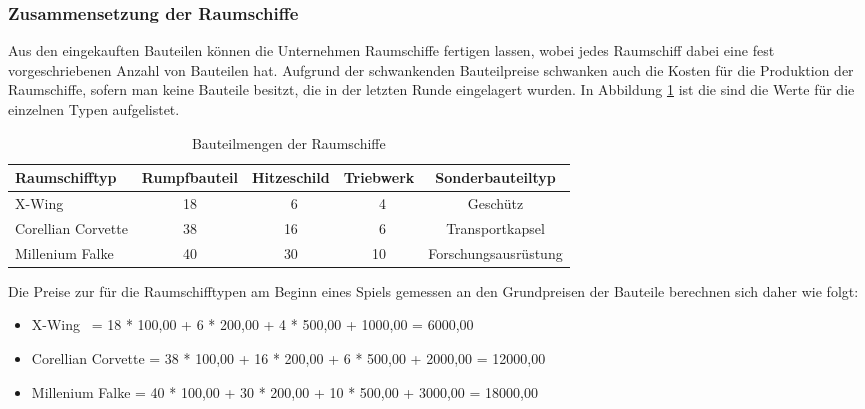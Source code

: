 \subsubsection{Zusammensetzung der Raumschiffe}
\label{subsub:spielwelt-datenbasis-raumschiffe-zusammensetzung}

Aus den eingekauften Bauteilen können die Unternehmen Raumschiffe fertigen lassen, wobei jedes Raumschiff dabei eine fest vorgeschriebenen Anzahl von Bauteilen hat. Aufgrund der schwankenden Bauteilpreise schwanken auch die Kosten für die Produktion der Raumschiffe, sofern man keine Bauteile besitzt, die in der letzten Runde eingelagert wurden. In Abbildung \ref{tab:spielwelt-datenbasis-raumschiffe-zusammensetzung} ist die sind die Werte für die einzelnen Typen aufgelistet.

\begin{table}[ht]\small
     \centering
     \begin{tabular}{ | l | c | c | c | c |  }
          \hline
          Raumschifftyp & Rumpfbauteil & Hitzeschild & Triebwerk & Sonderbauteiltyp \\
          \hline \hline
          X-Wing & 18 & \ 6 & \ 4 & Geschütz\\ \hline
          Corellian Corvette & 38 & 16 & \ 6 & Transportkapsel \\ \hline
          Millenium Falke & 40 & 30 & 10 & Forschungsausrüstung \\
          \hline
     \end{tabular}
     \caption{Bauteilmengen der Raumschiffe}
     \label{tab:spielwelt-datenbasis-raumschiffe-zusammensetzung}
\end{table}

Die Preise zur für die Raumschifftypen am Beginn eines Spiels gemessen an den Grundpreisen der Bauteile berechnen sich daher wie folgt:

\begin{itemize}
\item[] X-Wing \qquad\             = 18 * 100,00\curr{} +  6 * 200,00\curr{} +  4 * 500,00\curr{} + 1000,00\curr{} =  6000,00\curr{}
\item[] Corellian Corvette = 38 * 100,00\curr{} + 16 * 200,00\curr{} +  6 * 500,00\curr{} + 2000,00\curr{} = 12000,00\curr{}
\item[] Millenium Falke \quad    = 40 * 100,00\curr{} + 30 * 200,00\curr{} + 10 * 500,00\curr{} + 3000,00\curr{} = 18000,00\curr{}
\end{itemize}

